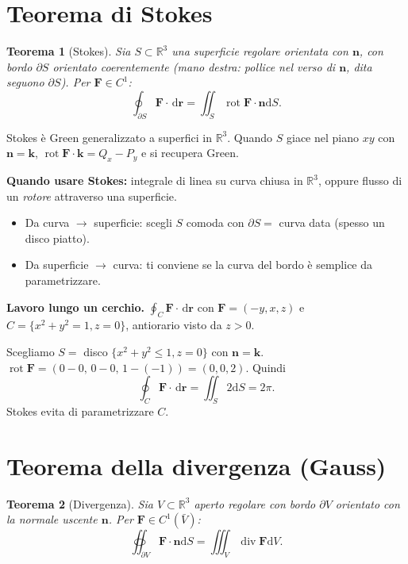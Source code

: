 \documentclass[11pt,a4paper,openany]{book}
\theoremstyle{plain}
\newtheorem{teorema}{Teorema}[chapter]
\theoremstyle{definition}
\theoremstyle{remark}
\newcommand{\R}{\mathbb{R}}
\newcommand{\dd}{\,\mathrm{d}}
\newcommand{\Div}{\operatorname{div}}
\newcommand{\Rot}{\operatorname{rot}}
\renewcommand{\vec}[1]{\mathbf{#1}}
\newcommand{\F}{\mathbf{F}}
\newcommand{\rr}{\mathbf{r}}
\newcommand{\nn}{\mathbf{n}}
\newcommand{\dS}{\mathrm{d}S}
\newcommand{\dV}{\mathrm{d}V}
\begin{document}
\section{Teorema di Stokes}

\begin{teorema}[Stokes]
Sia $S\subset\R^3$ una superficie regolare orientata con $\nn$, con bordo
$\partial S$ orientato \emph{coerentemente} (mano destra: pollice nel verso
di $\nn$, dita seguono $\partial S$). Per $\F\in C^1$:
\begin{equation}
  \oint_{\partial S}\F\cdot\dd\rr=\iint_S\Rot\F\cdot\nn\dS.
  \label{eq:stokes}
\end{equation}
\end{teorema}

\begin{nota}
Stokes \`e Green generalizzato a superfici in $\R^3$. Quando $S$ giace nel
piano $xy$ con $\nn=\vec{k}$, $\Rot\F\cdot\vec{k}=Q_x-P_y$ e si recupera Green.
\end{nota}

\begin{ricetta}
\textbf{Quando usare Stokes:} integrale di linea su curva chiusa in $\R^3$,
oppure flusso di un \emph{rotore} attraverso una superficie.
\begin{itemize}[leftmargin=*]
  \item Da curva $\to$ superficie: scegli $S$ comoda con $\partial S=$ curva
        data (spesso un disco piatto).
  \item Da superficie $\to$ curva: ti conviene se la curva del bordo \`e
        semplice da parametrizzare.
\end{itemize}
\end{ricetta}

\begin{esempio}
\textbf{Lavoro lungo un cerchio.} $\oint_C\F\cdot\dd\rr$ con $\F=(-y,x,z)$ e
$C=\{x^2+y^2=1,z=0\}$, antiorario visto da $z>0$.

Scegliamo $S=$ disco $\{x^2+y^2\le 1,z=0\}$ con $\nn=\vec{k}$.
$\Rot\F=(0-0,\,0-0,\,1-(-1))=(0,0,2)$. Quindi
\[
  \oint_C\F\cdot\dd\rr=\iint_S 2\dS=2\pi.
\]
Stokes evita di parametrizzare $C$.
\end{esempio}

\section{Teorema della divergenza (Gauss)}

\begin{teorema}[Divergenza]
Sia $V\subset\R^3$ aperto regolare con bordo $\partial V$ orientato con la
normale \emph{uscente} $\nn$. Per $\F\in C^1(\bar V)$:
\begin{equation}
  \oiint_{\partial V}\F\cdot\nn\dS=\iiint_V\Div\F\dV.
  \label{eq:gauss}
\end{equation}
\end{teorema}
\end{document}
